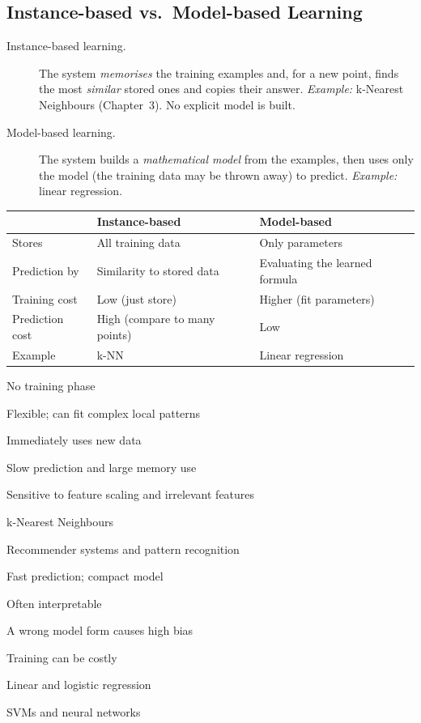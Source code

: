 \subsection{Instance-based vs.\ Model-based Learning}

\begin{description}
  \item[Instance-based learning.] The system \emph{memorises} the training examples and, for a new point, finds the most \emph{similar} stored ones and copies their answer. \emph{Example:} k-Nearest Neighbours (Chapter~3). No explicit model is built.
  \item[Model-based learning.] The system builds a \emph{mathematical model} from the examples, then uses only the model (the training data may be thrown away) to predict. \emph{Example:} linear regression.
\end{description}

\begin{center}
\begin{tabular}{@{}p{3.5cm}p{5.2cm}p{5.2cm}@{}}
\toprule
 & \textbf{Instance-based} & \textbf{Model-based}\\
\midrule
Stores & All training data & Only parameters\\
Prediction by & Similarity to stored data & Evaluating the learned formula\\
Training cost & Low (just store) & Higher (fit parameters)\\
Prediction cost & High (compare to many points) & Low\\
Example & k-NN & Linear regression\\
\bottomrule
\end{tabular}
\end{center}



{\item No training phase
 \item Flexible; can fit complex local patterns
 \item Immediately uses new data}
{\item Slow prediction and large memory use
 \item Sensitive to feature scaling and irrelevant features}
{\item k-Nearest Neighbours
 \item Recommender systems and pattern recognition}

{\item Fast prediction; compact model
 \item Often interpretable}
{\item A wrong model form causes high bias
 \item Training can be costly}
{\item Linear and logistic regression
 \item SVMs and neural networks}

